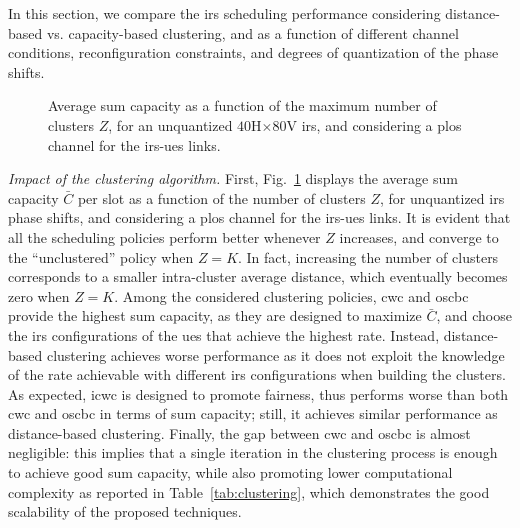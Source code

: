 In this section, we compare the \gls{irs} scheduling performance considering distance-based vs. capacity-based clustering, and as a function of different channel conditions, reconfiguration constraints, and degrees of quantization of the phase shifts. 

\begin{figure}[t]
    \centering
       \setlength{}
    \setlength{}
     
    \caption{Average sum capacity as a function of the maximum number of clusters $Z$, for an unquantized $40$H$\times80$V \gls{irs}, and considering a \gls{plos} channel for the \gls{irs}-\glspl{ue} links.}
    \label{fig:sumcap0bitlos}
\end{figure}

\emph{Impact of the clustering algorithm.}
First, Fig.~\ref{fig:sumcap0bitlos} displays the average sum capacity $\bar{C}$ per slot as a function of the number of clusters $Z$, for unquantized \gls{irs} phase shifts, and considering a \gls{plos} channel for the \gls{irs}-\glspl{ue} links. 
It is evident that all the scheduling policies perform better whenever $Z$ increases, and converge to the ``unclustered'' policy when $Z=K$. In fact, increasing the number of clusters corresponds to a smaller intra-cluster average distance, which eventually becomes zero when $Z=K$. 
Among the considered clustering policies, \gls{cwc} and \gls{oscbc} provide the highest sum capacity, as they are designed to maximize $\bar{C}$, and choose the \gls{irs} configurations of the \glspl{ue} that achieve the highest rate. Instead, distance-based clustering achieves worse performance as it does not exploit the knowledge of the rate achievable with different \gls{irs} configurations when building the clusters.
As expected, \gls{icwc} is designed to promote fairness, thus performs worse than both \gls{cwc} and \gls{oscbc} in terms of sum capacity; still, it achieves similar performance as distance-based clustering.
Finally, the gap between \gls{cwc} and \gls{oscbc} is almost negligible: this implies that a single iteration in the clustering process is enough to achieve good sum capacity, while also promoting lower computational complexity as reported in Table~\ref{tab:clustering}, which demonstrates the good scalability of the proposed techniques.


